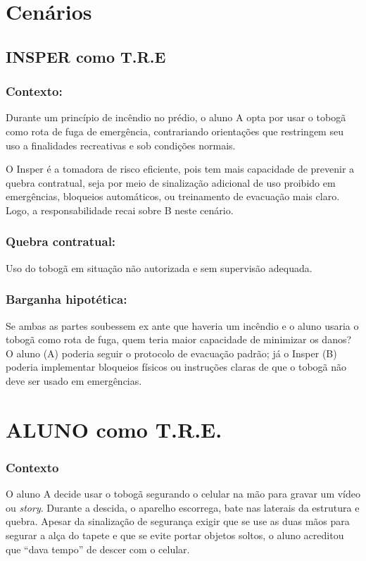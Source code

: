 \documentclass[a4paper,12pt]{article}[abntex2]
\begin{document}
\section{\textbf{Cenários}}



\subsection*{{\textbf{INSPER como T.R.E}}}
\subsubsection*{Contexto:}
Durante um princípio de incêndio no prédio, o aluno A opta por usar o tobogã como rota de fuga de emergência, contrariando orientações que restringem seu uso a finalidades recreativas e sob condições normais.

O Insper é a tomadora de risco eficiente, pois tem mais capacidade de prevenir a quebra contratual, seja por meio de sinalização adicional de uso proibido em emergências, bloqueios automáticos, ou treinamento de evacuação mais claro. Logo, a responsabilidade recai sobre B neste cenário.

\subsubsection*{Quebra contratual:}
Uso do tobogã em situação não autorizada e sem supervisão adequada.

\subsubsection*{Barganha hipotética:}
Se ambas as partes soubessem ex ante que haveria um incêndio e o aluno usaria o tobogã como rota de fuga, quem teria maior capacidade de minimizar os danos? O aluno (A) poderia seguir o protocolo de evacuação padrão; já o Insper (B) poderia implementar bloqueios físicos ou instruções claras de que o tobogã não deve ser usado em emergências.

\section*{ALUNO como T.R.E.}

\subsubsection*{Contexto}

O aluno A decide usar o tobogã segurando o celular na mão para gravar um vídeo ou \textit{story}. Durante a descida, o aparelho escorrega, bate nas laterais da estrutura e quebra. Apesar da sinalização de segurança exigir que se use as duas mãos para segurar a alça do tapete e que se evite portar objetos soltos, o aluno acreditou que ``dava tempo'' de descer com o celular.
\end{document}
